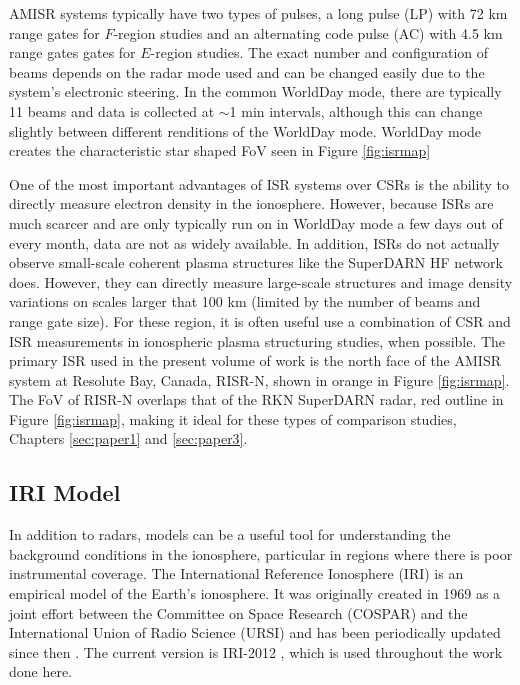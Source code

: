 AMISR systems typically have two types of pulses, a long pulse (LP) with 72 km range gates for \(F\)-region studies and an alternating code pulse (AC) with 4.5 km range gates gates for \(E\)-region studies.  The exact number and configuration of beams depends on the radar mode used and can be changed easily due to the system's electronic steering.  In the common WorldDay mode, there are typically 11 beams and data is collected at \(\sim\)1 min intervals, although this can change slightly between different renditions of the WorldDay mode.  WorldDay mode creates the characteristic star shaped FoV seen in Figure \ref{fig:isrmap}

One of the most important advantages of ISR systems over CSRs is the ability to directly measure electron density in the ionosphere.  However, because ISRs are much scarcer and are only typically run on in WorldDay mode a few days out of every month, data are not as widely available.  In addition, ISRs do not actually observe small-scale coherent plasma structures like the SuperDARN HF network does.  However, they can directly measure large-scale structures and image density variations on scales larger that 100 km (limited by the number of beams and range gate size).  For these region, it is often useful use a combination of CSR and ISR measurements in ionospheric plasma structuring studies, when possible.  The primary ISR used in the present volume of work is the north face of the AMISR system at Resolute Bay, Canada, RISR-N, shown in orange in Figure \ref{fig:isrmap}.  The FoV of RISR-N overlaps that of the RKN SuperDARN radar, red outline in Figure \ref{fig:isrmap}, making it ideal for these types of comparison studies, Chapters \ref{sec:paper1} and \ref{sec:paper3}.

\subsection{IRI Model}
\label{sec:iri}
In addition to radars, models can be a useful tool for understanding the background conditions in the ionosphere, particular in regions where there is poor instrumental coverage.  The International Reference Ionosphere (IRI) is an empirical model of the Earth's ionosphere.  It was originally created in 1969 as a joint effort between the Committee on Space Research (COSPAR) and the International Union of Radio Science (URSI) and has been periodically updated since then \citep{Rawer1975,Rawer1978,Rawer1981,Bilitza1985,Bilitza1986,Bilitza1990,Bilitza1997,Bilitza2001,Bilitza2008}.  The current version is IRI-2012 \citep{Bilitza2014}, which is used throughout the work done here.

